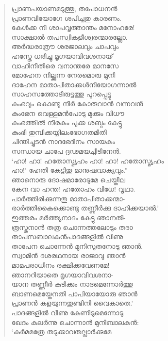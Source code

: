 \begin{verse}
പ്രാണപയാണമടുത്തു, തപോധനന്‍\\
പ്രാണവിയോഗേ ശപിച്ചതു കാരണം.\\
കേള്‍ക്ക നീ ശാപവൃത്താന്തം മനോഹരേ!\\
സാക്ഷാല്‍ തപസ്വികളീശ്വരന്മാരല്ലോ.\\
അര്‍ദ്ധരാത്രൗ ശരജാലവും ചാപവും\\
ഹസ്തേ ധരിച്ചു മൃഗയാവിവശനായ്\\
വാഹിനീതീരെ വനാന്തരേ മാനസേ\\
മോഹേന നില്ക്കുന്ന നേരമൊരു മുനി\\
ദാഹേന മാതാപിതാക്കള്‍നിയോഗന്നാല്‍\\
സാഹസത്തോടിരുട്ടത്തു പുറപ്പെട്ടു\\
കുംഭവും കൊണ്ടു നീര്‍ കോരുവാന്‍ വന്നവന്‍\\
കുംഭേന വെള്ളമന്‍പോടു മുക്കും വിധൗ\\
കുംഭത്തില്‍ നീരകം പുക്ക ശബ്ദം കേട്ടു\\
കുംഭി തുമ്പിക്കയ്യിലംഭോഗതമിതി\\
ചിന്തിച്ചുടന്‍ നാദഭേദിനം സായകം\\
സന്ധായ ചാപേ ദൃഢമയച്ചീടിനേന്‍.\\
‘ഹാ! ഹാ! ഹതോസ്മ്യഹം ഹാ! ഹാ! ഹതോസ്മ്യഹം\\
ഹാ!’ ഹേതി കേട്ടിതു മാനുഷവാക്യവും.”\\
ഞാനൊരു ദോഷമാരോടുമേ ചെയ്തീല\\
കേന വാ ഹന്ത! ഹതോഹം വിധേ! വൃഥാ.\\
പാര്‍ത്തിരിക്കുന്നതു മാതാപിതാക്കന്മാ-\\
രാര്‍ത്തികൈക്കൊണ്ടു തണ്ണീര്‍ക്കു ദാഹിക്കയാല്‍.’\\
ഇത്തരം മര്‍ത്ത്യനാദം കേട്ടു ഞാനതി-\\
ത്രസ്തനാന്‍ തത്ര ചൊന്നത്തലോടും തദാ\\
താപസബാലകന്‍പാദങ്ങളില്‍ വീണു\\
താപേന ചൊന്നേന്‍ മുനിസുതനോടു ഞാന്‍.\\
സ്വാമിന്‍ ദശരഥനായ രാജാവു ഞാന്‍\\
മാമപരാധിനം രക്ഷിക്കവേണമേ!\\
ഞാനറിയാതെ മൃഗയാവിവശനാ-\\
യാന തണ്ണീര്‍ കുടിക്കും നാദമെന്നോര്‍ത്തു\\
ബാണമെയ്തേനതി പാപിയായോരു ഞാന്‍\\
പ്രാണന്‍ കളയുന്നതുണ്ടിനി വൈകാതെ.’\\
പാദങ്ങളില്‍ വീണു കേണീടുമെന്നോടു\\
ഖേദം കലര്‍ന്നു ചൊന്നാന്‍ മുനിബാലകന്‍:\\
‘കര്‍മമത്രേ തടുക്കാവതല്ലാര്‍ക്കുമേ\\

\end{verse}
